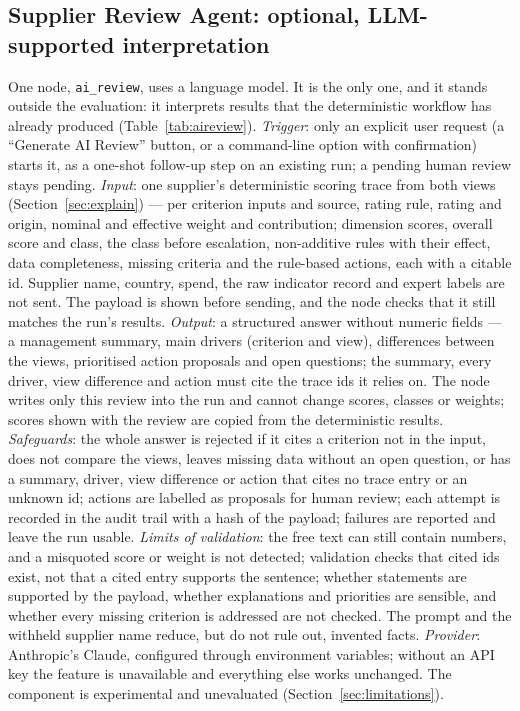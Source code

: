 \documentclass[10pt,twocolumn,a4paper]{article}
\newcommand{\code}[1]{{\small\texttt{#1}}}
\begin{document}
\subsection{Supplier Review Agent: optional, LLM-supported interpretation}
\label{sec:aireview}
One node, \code{ai\_review}, uses a language model. It is the only one, and it stands
outside the evaluation: it interprets results that the deterministic workflow has already
produced (Table~\ref{tab:aireview}).
\emph{Trigger}: only an explicit user request (a ``Generate AI Review'' button, or a
command-line option with confirmation) starts it, as a one-shot follow-up step on an
existing run; a pending human review stays pending.
\emph{Input}: one supplier's deterministic scoring trace from both views
(Section~\ref{sec:explain}) --- per criterion inputs and source, rating rule, rating and
origin, nominal and effective weight and contribution; dimension scores, overall score and
class, the class before escalation, non-additive rules with their effect, data completeness,
missing criteria and the rule-based actions, each with a citable id. Supplier name, country, spend, the raw indicator record and expert
labels are not sent. The payload is shown before sending, and the node checks that it
still matches the run's results.
\emph{Output}: a structured answer without numeric fields --- a management summary, main
drivers (criterion and view), differences between the views, prioritised action
proposals and open questions; the summary, every driver, view difference and action must cite
the trace ids it relies on. The node writes only this review into the run and cannot change
scores, classes or weights; scores shown with the review are copied from the deterministic
results.
\emph{Safeguards}: the whole answer is rejected if it cites a criterion not in the input,
does not compare the views, leaves missing data without an open question, or has a summary,
driver, view difference or action that cites no trace entry or an unknown id; actions are
labelled as proposals for human review; each attempt is recorded in the audit trail with
a hash of the payload; failures are reported and leave the run usable.
\emph{Limits of validation}: the free text can still contain numbers, and a misquoted score or
weight is not detected; validation checks that cited ids exist, not that a cited entry
supports the sentence; whether statements are supported by the payload, whether explanations
and priorities are sensible, and whether every missing criterion is addressed are not checked.
The prompt and the withheld supplier name reduce, but do not rule out, invented facts.
\emph{Provider}: Anthropic's Claude, configured through environment variables; without
an API key the feature is unavailable and everything else works unchanged. The component
is experimental and unevaluated (Section~\ref{sec:limitations}).
\end{document}
